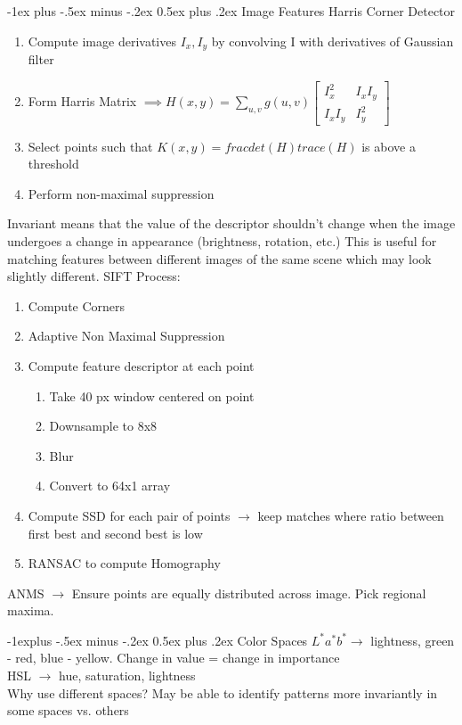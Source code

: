 \documentclass[10pt,landscape]{article}
\makeatletter
\renewcommand{\section}{\@startsection{section}{1}{0mm}%
                                {-1ex plus -.5ex minus -.2ex}%
                                {0.5ex plus .2ex}%
                                {\normalfont\large\bfseries}}
\renewcommand{\subsection}{\@startsection{subsection}{2}{0mm}%
                                {-1explus -.5ex minus -.2ex}%
                                {0.5ex plus .2ex}%
                                {\normalfont\normalsize\bfseries}}
\makeatother
\begin{document}
\begin{multicols}{3}
\section{Image Features}
Harris Corner Detector
\begin{enumerate}
        \item Compute image derivatives $I_x, I_y$ by convolving I with derivatives of Gaussian filter
        \item Form Harris Matrix $\implies H(x,y) = \sum_{u,v} g(u,v) \begin{bmatrix}I_x^2 & I_x I_y \\ I_x I_y & I_y^2\end{bmatrix}$
        \item Select points such that $K(x,y) = frac{det(H)}{trace(H)}$ is above a threshold
        \item Perform non-maximal suppression
\end{enumerate}
Invariant means that the value of the descriptor shouldn't change when the image undergoes a change in appearance (brightness, rotation, etc.)
This is useful for matching features between different images of the same scene which may look slightly different.
SIFT Process:
\begin{enumerate} 
        \item Compute Corners
        \item Adaptive Non Maximal Suppression
        \item Compute feature descriptor at each point
        \begin{enumerate}
                \item Take 40 px window centered on point
                \item Downsample to 8x8
                \item Blur 
                \item Convert to 64x1 array
        \end{enumerate}
        \item Compute SSD for each pair of points $\rightarrow$ keep matches where ratio between first best and second best is low
        \item RANSAC to compute Homography
\end{enumerate}
ANMS $\rightarrow$ Ensure points are equally distributed across image. Pick regional maxima.

\subsection{Color Spaces}
$L^*a^*b^* \rightarrow$ lightness, green - red, blue - yellow. Change in value = change in importance
\\ HSL $\rightarrow$ hue, saturation, lightness
\\ Why use different spaces? May be able to identify patterns more invariantly in some spaces vs. others



\end{multicols}
\end{document}
